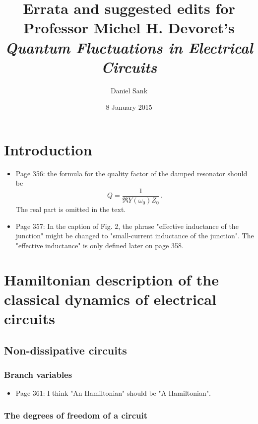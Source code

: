 \documentclass{article}
\title{Errata and suggested edits for \\
Professor Michel H. Devoret's\\
\textit{Quantum Fluctuations in Electrical Circuits}}
\author{Daniel Sank}
\date{8 January 2015}
\begin{document}
\maketitle

\section{Introduction}

\begin{itemize}

\item Page 356: the formula for the quality factor of the damped resonator should be
\begin{equation}
Q = \frac{1}{\Re{Y(\omega_0)} Z_0} \nonumber \, .
\end{equation} 
The real part is omitted in the text.

\item Page 357: In the caption of Fig. 2, the phrase "effective inductance of the junction" might be changed to "small-current inductance of the junction". The "effective inductance" is only defined later on page 358.

\end{itemize}


\section{Hamiltonian description of the classical dynamics of electrical circuits}

\subsection{Non-dissipative circuits}

\subsubsection{Branch variables}

\begin{itemize}

\item Page 361: I think "An Hamiltonian" should be "A Hamiltonian".

\end{itemize}

\subsubsection{The degrees of freedom of a circuit}
\end{document}

